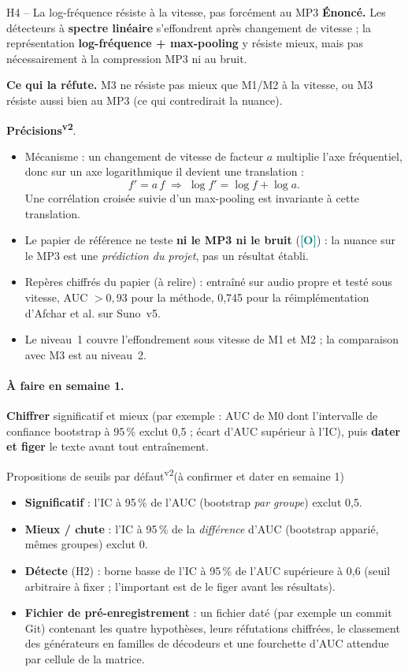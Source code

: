 \documentclass[11pt,a4paper]{article}
\providecommand{\og}{\guillemotleft\nobreakspace}%
\providecommand{\fg}{\nobreakspace\guillemotright}}
\newcommand{\vtwo}{\textsuperscript{\textcolor{orange!80!black}{\textbf{v2}}}}
\newcommand{\lO}{\textbf{\textcolor{teal}{[O]}}}
\newcommand{\vtwot}{\textsuperscript{v2}}  %
\begin{document}
\begin{hyp}{H4 -- La log-fréquence résiste à la vitesse, pas forcément au MP3}
\textbf{Énoncé.} Les détecteurs à \textbf{spectre linéaire} s'effondrent après changement de vitesse ; la représentation \textbf{log-fréquence + max-pooling} y résiste mieux, mais pas nécessairement à la compression MP3 ni au bruit.

\textbf{Ce qui la réfute.} M3 ne résiste pas mieux que M1/M2 à la vitesse, ou M3 résiste aussi bien au MP3 (ce qui contredirait la nuance).

\textbf{Précisions}\vtwo.
\begin{itemize}
\item Mécanisme : un changement de vitesse de facteur $a$ multiplie l'axe fréquentiel, donc sur un axe logarithmique il devient une translation :
\[
f' = a\,f \;\Longrightarrow\; \log f' = \log f + \log a .
\]
Une corrélation croisée suivie d'un max-pooling est invariante à cette translation.
\item Le papier de référence ne teste \textbf{ni le MP3 ni le bruit} (\lO) : la nuance sur le MP3 est une \emph{prédiction du projet}, pas un résultat établi.
\item Repères chiffrés du papier (à relire) : entraîné sur audio propre et testé sous vitesse, AUC $>0{,}93$ pour la méthode, 0,745 pour la réimplémentation d'Afchar et al. sur Suno~v5.
\item Le niveau~1 couvre l'effondrement sous vitesse de M1 et M2 ; la comparaison avec M3 est au niveau~2.
\end{itemize}
\end{hyp}

\paragraph{À faire en semaine 1.} \textbf{Chiffrer} \og{}significatif\fg{} et \og{}mieux\fg{} (par exemple : \og{}AUC de M0 dont l'intervalle de confiance bootstrap à 95\,\% exclut 0,5\fg{} ; \og{}écart d'AUC supérieur à l'IC\fg{}), puis \textbf{dater et figer} le texte avant tout entraînement.

\begin{corr}{Propositions de seuils par défaut\vtwot (à confirmer et dater en semaine 1)}
\begin{itemize}
\item \textbf{Significatif} : l'IC à 95\,\% de l'AUC (bootstrap \emph{par groupe}) exclut 0,5.
\item \textbf{Mieux / chute} : l'IC à 95\,\% de la \emph{différence} d'AUC (bootstrap apparié, mêmes groupes) exclut 0.
\item \textbf{Détecte} (H2) : borne basse de l'IC à 95\,\% de l'AUC supérieure à 0,6 (seuil arbitraire à fixer ; l'important est de le figer avant les résultats).
\item \textbf{Fichier de pré-enregistrement} : un fichier daté (par exemple un commit Git) contenant les quatre hypothèses, leurs réfutations chiffrées, le classement des générateurs en familles de décodeurs et une fourchette d'AUC attendue par cellule de la matrice.
\end{itemize}
\end{corr}
\end{document}
